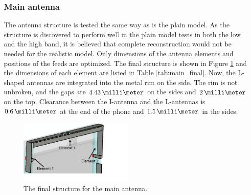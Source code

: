 \subsubsection{Main antenna}
\label{sec:main_antenna}
The antenna structure is tested the same way as is the plain model. As the structure is discovered to perform well in the plain model tests in both the low and the high band, it is believed that complete reconstruction would not be needed for the realistic model. Only dimensions of the antenna elements and positions of the feeds are optimized. The final structure is shown in Figure \ref{fig:main_final} and the dimensions of each element are listed in Table \ref{tab:main_final}. Now, the L-shaped antennas are integrated into the metal rim on the side. The rim is not unbroken, and the gaps are $4.43\,\milli\meter$ on the sides and $2\,\milli\meter$ on the top. Clearance between the I-antenna and the L-antennas is $0.6\,\milli\meter$ at the end of the phone and $1.5\,\milli\meter$ in the sides.
\begin{figure}[H]
    \centering
    \includegraphics[width=0.5\textwidth]{img/main_final.eps}
    \caption{The final structure for the main antenna.}
    \label{fig:main_final}
\end{figure}

